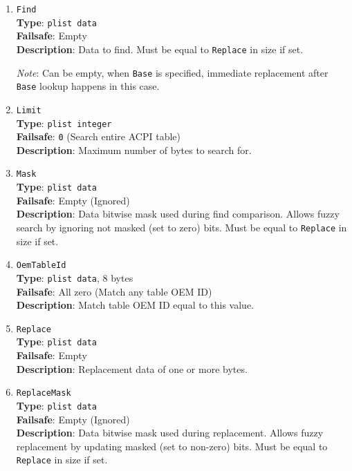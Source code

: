 \documentclass[]{article}
\begin{document}
\begin{enumerate}
\item
  \texttt{Find}\\
  \textbf{Type}: \texttt{plist\ data}\\
  \textbf{Failsafe}: Empty\\
  \textbf{Description}: Data to find. Must be equal to \texttt{Replace} in size if set.

  \emph{Note}: Can be empty, when \texttt{Base} is specified, immediate replacement
  after \texttt{Base} lookup happens in this case.

\item
  \texttt{Limit}\\
  \textbf{Type}: \texttt{plist\ integer}\\
  \textbf{Failsafe}: \texttt{0} (Search entire ACPI table)\\
  \textbf{Description}: Maximum number of bytes to search for.

\item
  \texttt{Mask}\\
  \textbf{Type}: \texttt{plist\ data}\\
  \textbf{Failsafe}: Empty (Ignored)\\
  \textbf{Description}: Data bitwise mask used during find comparison.
  Allows fuzzy search by ignoring not masked (set to zero) bits.
  Must be equal to \texttt{Replace} in size if set.

\item
  \texttt{OemTableId}\\
  \textbf{Type}: \texttt{plist\ data}, 8 bytes\\
  \textbf{Failsafe}: All zero (Match any table OEM ID)\\
  \textbf{Description}: Match table OEM ID equal to this value.

\item
  \texttt{Replace}\\
  \textbf{Type}: \texttt{plist\ data}\\
  \textbf{Failsafe}: Empty\\
  \textbf{Description}: Replacement data of one or more bytes.

\item
  \texttt{ReplaceMask}\\
  \textbf{Type}: \texttt{plist\ data}\\
  \textbf{Failsafe}: Empty (Ignored)\\
  \textbf{Description}: Data bitwise mask used during replacement.
  Allows fuzzy replacement by updating masked (set to non-zero) bits.
  Must be equal to \texttt{Replace} in size if set.


\end{enumerate}
\end{document}

